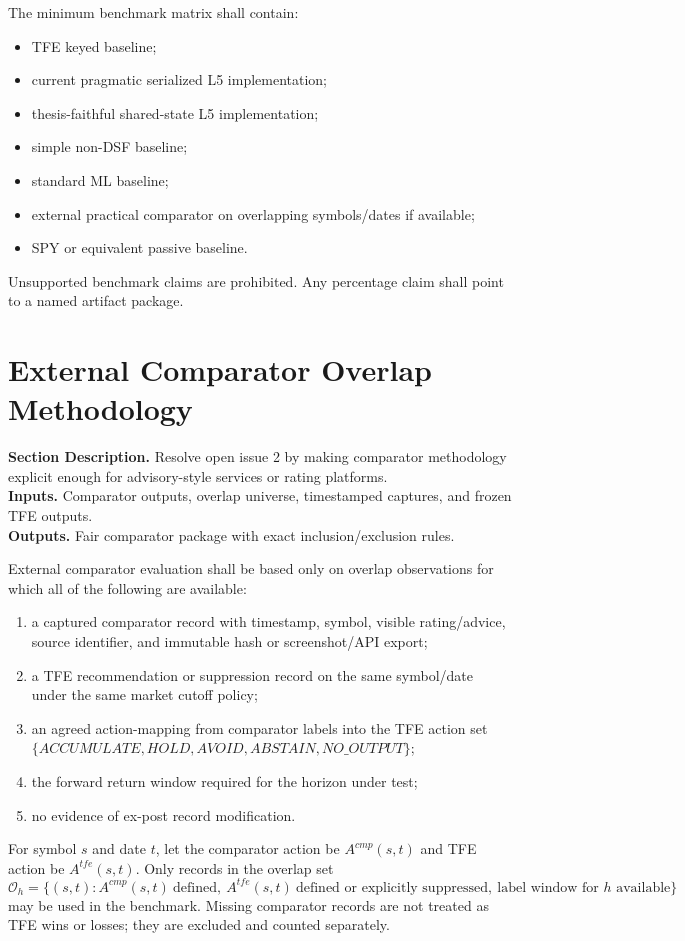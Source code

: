 \documentclass[11pt]{report}
\newcommand{\meta}[3]{\textbf{Section Description.} #1\\
\textbf{Inputs.} #2\\
\textbf{Outputs.} #3\par}
\begin{document}
The minimum benchmark matrix shall contain:
\begin{itemize}
    \item TFE keyed baseline;
    \item current pragmatic serialized L5 implementation;
    \item thesis-faithful shared-state L5 implementation;
    \item simple non-DSF baseline;
    \item standard ML baseline;
    \item external practical comparator on overlapping symbols/dates if available;
    \item SPY or equivalent passive baseline.
\end{itemize}
Unsupported benchmark claims are prohibited. Any percentage claim shall point to a named artifact package.

\section{External Comparator Overlap Methodology}
\meta{Resolve open issue 2 by making comparator methodology explicit enough for advisory-style services or rating platforms.}{Comparator outputs, overlap universe, timestamped captures, and frozen TFE outputs.}{Fair comparator package with exact inclusion/exclusion rules.}

External comparator evaluation shall be based only on overlap observations for which all of the following are available:
\begin{enumerate}[leftmargin=1.2cm]
    \item a captured comparator record with timestamp, symbol, visible rating/advice, source identifier, and immutable hash or screenshot/API export;
    \item a TFE recommendation or suppression record on the same symbol/date under the same market cutoff policy;
    \item an agreed action-mapping from comparator labels into the TFE action set $\{ACCUMULATE,HOLD,AVOID,ABSTAIN,NO\_OUTPUT\}$;
    \item the forward return window required for the horizon under test;
    \item no evidence of ex-post record modification.
\end{enumerate}

For symbol $s$ and date $t$, let the comparator action be $A^{cmp}(s,t)$ and TFE action be $A^{tfe}(s,t)$. Only records in the overlap set
\[
\mathcal{O}_h = \{(s,t): A^{cmp}(s,t)\ \text{defined},\ A^{tfe}(s,t)\ \text{defined or explicitly suppressed},\ \text{label window for } h \text{ available}\}
\]
may be used in the benchmark. Missing comparator records are not treated as TFE wins or losses; they are excluded and counted separately.
\end{document}

